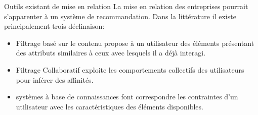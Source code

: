 \documentclass[aspectratio=169, 10pt]{beamer}
\begin{document}
\begin{frame}{Outils existant de mise en relation}
	La mise en relation des entreprises pourrait s'apparenter à un système de recommandation. Dans la littérature il existe principalement trois déclinaison:
	\begin{itemize}
		\item Filtrage   basé sur le contenu propose à un utilisateur des
		éléments présentant des attributs similaires à ceux avec lesquels il a déjà interagi.
		\item Filtrage Collaboratif exploite les comportements collectifs
		des utilisateurs pour inférer des affinités.
		\item systèmes à base de connaissances font correspondre les
		contraintes d’un utilisateur avec les caractéristiques des éléments disponibles.
	\end{itemize}
\end{frame}
\end{document}

